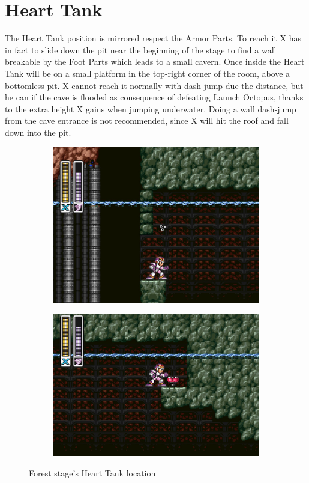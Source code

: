 \section{Heart Tank}
The Heart Tank position is mirrored respect the Armor Parts. To reach it X has in fact to slide down the pit near the beginning of the stage to find a wall breakable by the Foot Parts which leads to a small cavern. Once inside the Heart Tank will be on a small platform in the top-right corner of the room, above a bottomless pit. X cannot reach it normally with dash jump due the distance, but he can if  the cave is flooded as consequence of defeating Launch Octopus, thanks to the extra height X gains when jumping underwater. Doing a wall dash-jump from the cave entrance is not recommended, since X will hit the roof and fall down into the pit.
\begin{figure}[htp]
	\centering
	\begin{subfigure}{0.4\linewidth}
		\centering
		\includegraphics[width=\linewidth]{figures/X1/Sting_chameleon/Sting_heart_1.jpg}
	\end{subfigure}
	\begin{subfigure}{0.45\linewidth}
		\centering
		\includegraphics[width=\linewidth]{figures/X1/Sting_chameleon/Sting_heart_2.jpg}
	\end{subfigure}
	\caption{Forest stage's Heart Tank location}
\end{figure}

